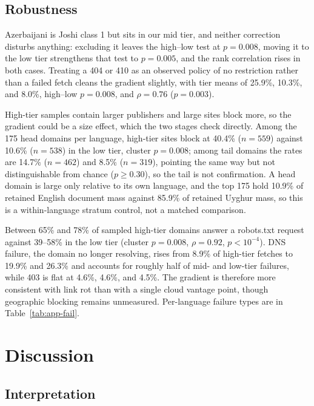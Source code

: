 \documentclass[11pt]{article}
\begin{document}
\subsection{Robustness}

Azerbaijani is Joshi class 1 but sits in our mid tier, and neither correction disturbs anything: excluding it leaves the high--low test at $p = 0.008$, moving it to the low tier strengthens that test to $p = 0.005$, and the rank correlation rises in both cases. Treating a 404 or 410 as an observed policy of no restriction rather than a failed fetch cleans the gradient slightly, with tier means of 25.9\%, 10.3\%, and 8.0\%, high--low $p = 0.008$, and $\rho = 0.76$ ($p = 0.003$).

High-tier samples contain larger publishers and large sites block more, so the gradient could be a size effect, which the two stages check directly. Among the 175 head domains per language, high-tier sites block at 40.4\% ($n=559$) against 10.6\% ($n=538$) in the low tier, cluster $p = 0.008$; among tail domains the rates are 14.7\% ($n=462$) and 8.5\% ($n=319$), pointing the same way but not distinguishable from chance ($p \ge 0.30$), so the tail is not confirmation. A head domain is large only relative to its own language, and the top 175 hold 10.9\% of retained English document mass against 85.9\% of retained Uyghur mass, so this is a within-language stratum control, not a matched comparison.

Between 65\% and 78\% of sampled high-tier domains answer a robots.txt request against 39--58\% in the low tier (cluster $p = 0.008$, $\rho = 0.92$, $p < 10^{-4}$). DNS failure, the domain no longer resolving, rises from 8.9\% of high-tier fetches to 19.9\% and 26.3\% and accounts for roughly half of mid- and low-tier failures, while 403 is flat at 4.6\%, 4.6\%, and 4.5\%. The gradient is therefore more consistent with link rot than with a single cloud vantage point, though geographic blocking remains unmeasured. Per-language failure types are in Table~\ref{tab:app-fail}.

\section{Discussion}

\subsection{Interpretation}
\end{document}
